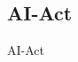 \documentclass[aspectratio=169,16pt,xcolor=table]{beamer}
\begin{document}
\subsection{AI-Act}
\begin{frame}{AI-Act}
    \begin{center}
    \end{center}
  \end{frame}


\end{document}
